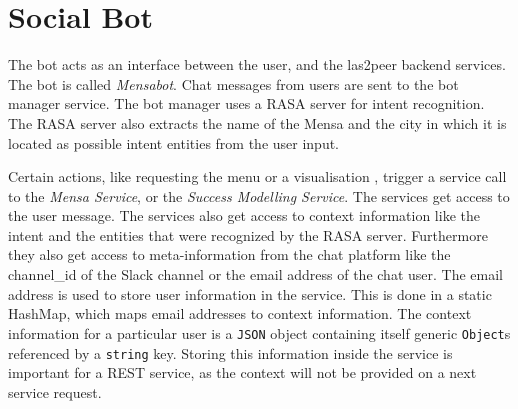 \section{Social Bot}

The bot acts as an interface between the user, and the las2peer backend services. The bot is called \emph{Mensabot}.
Chat messages from users are sent to the bot manager service. 
The bot manager uses a RASA server for intent recognition. 
The RASA server also extracts the name of the Mensa and the city in which it is located as possible intent entities from the user input.

Certain actions, like requesting the menu or a visualisation , trigger a service call to the \emph{Mensa Service}, or the \emph{Success Modelling Service}.
The services get access to the user message.  
The services also get access to context information like the intent and the entities that were recognized by the RASA server.
Furthermore they also get access to meta-information from the chat platform like the channel\_id of the Slack channel or the email address of the chat user. 
The email address is used to store user information in the service. This is done in a static HashMap, which maps email addresses to context information. The context information for a particular user is a \texttt{JSON} object containing itself generic \texttt{Object}s referenced by a \texttt{string} key. 
Storing this information inside the service is important for a REST service, as the context will not be provided on a next service request.

